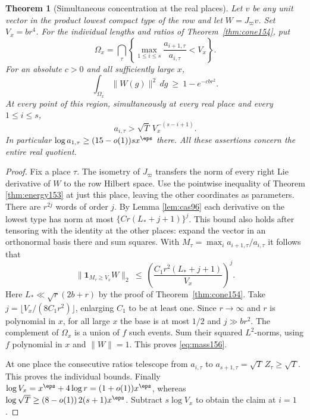\documentclass[a4paper,11pt]{article}
\newtheorem{theorem}[proposition]{Theorem}
\theoremstyle{definition}
\theoremstyle{remark}
\numberwithin{equation}{section}
\begin{document}
\begin{theorem}[Simultaneous concentration at the real places]
\label{thm:localmass156}
Let \(v\) be any unit vector in the product lowest compact
type of the row and let \(W=J_\varpi v\). Set \(V_x=b r^4\).
For the individual lengths and ratios of
Theorem~\ref{thm:cone154}, put
\[
    \Omega_x=\bigcap_{\tau}
       \left\{\max_{1\le i\le s}\frac{a_{i+1,\tau}}{a_{i,\tau}}
                                                     <V_x\right\}.
\]
For an absolute \(c>0\) and all sufficiently large \(x\),
\begin{equation}
   \int_{\Omega_x}\|W(g)\|^2\,d\dot g\ \ge\ 1-e^{-c b r^2}.
   \label{eq:mass156}
\end{equation}
At every point of this region, simultaneously at every real
place and every \(1\le i\le s\),
\[
        a_{i,\tau}>\sqrt T\,V_x^{-(s-i+1)} .
\]
In particular \(\log a_{1,\tau}\ge(15-o(1))s x^\eps\) there.
All these assertions concern the entire real quotient.
\end{theorem}
\begin{proof}
Fix a place \(\tau\). The isometry of \(J_\varpi\) transfers
the norm of every right Lie derivative of \(W\) to the row
Hilbert space. Use the pointwise inequality of Theorem \ref{thm:energy153} at just this place, leaving the other coordinates
as parameters. There are \(r^{2j}\) words of order \(j\).
By Lemma \ref{lem:cas96} each derivative on the lowest type
has norm at most \(\{Cr(L_*+j+1)\}^j\). This bound also holds
after tensoring with the identity at the other places: expand
the vector in an orthonormal basis there and sum squares.
With \(M_\tau=\max_i a_{i+1,\tau}/a_{i,\tau}\) it follows that
\[
        \|\mathbf1_{M_\tau\ge V_x}W\|_2
         \ \le\ \left(\frac{C_1r^2(L_*+j+1)}{V_x}\right)^j .
\]
Here \(L_*\ll\sqrt r(2b+r)\) by the proof of
Theorem~\ref{thm:cone154}. Take \(j=\lfloor V_x/(8C_1r^2)\rfloor\),
enlarging \(C_1\) to be at least one. Since \(r\to\infty\)
and \(r\) is polynomial in \(x\), for all large \(x\) the base
is at most \(1/2\) and \(j\gg b r^2\). The complement of
\(\Omega_x\) is a union of \(f\) such events. Sum their
squared \(L^2\)-norms, using \(f\) polynomial in \(x\) and
\(\|W\|=1\). This proves \eqref{eq:mass156}.

At one place the consecutive ratios telescope from \(a_{i,\tau}\)
to \(a_{s+1,\tau}=\sqrt T\, Z_\tau\ge\sqrt T\).
This proves the individual bounds. Finally
\(\log V_x=x^\eps+4\log r=(1+o(1))x^\eps\), whereas
\(\log\sqrt T\ge(8-o(1))\,2(s+1)x^\eps\). Subtract
\(s\log V_x\) to obtain the claim at \(i=1\).
\end{proof}
\end{document}
